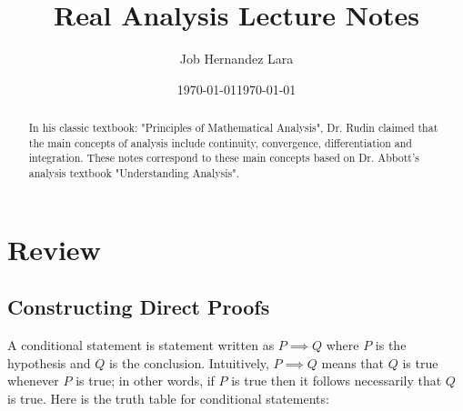 \documentclass[10pt]{amsbook}
\title{Real Analysis Lecture Notes}
\author{Job Hernandez Lara}
\date{\today}
\begin{document}
\frontmatter 

\date{\today}

\begin{abstract}
In his classic textbook: "Principles of Mathematical Analysis", Dr. Rudin claimed that the main concepts of analysis include continuity, convergence, differentiation and integration. These notes correspond to these main concepts based on Dr. Abbott's analysis textbook "Understanding Analysis".
\end{abstract}

\maketitle 

\newpage 

\tableofcontents 

\mainmatter



\chapter{Review}

\section{Constructing Direct Proofs}
A conditional statement is statement written as $P\implies Q$ where $P$ is the hypothesis and $ Q $ is the conclusion. Intuitively, $P \implies Q$ means that $Q$ is true whenever $P$ is true; in other words, if $P$ is true then it follows necessarily that $Q$ is true. Here is the truth table for conditional statements:
\end{document}
